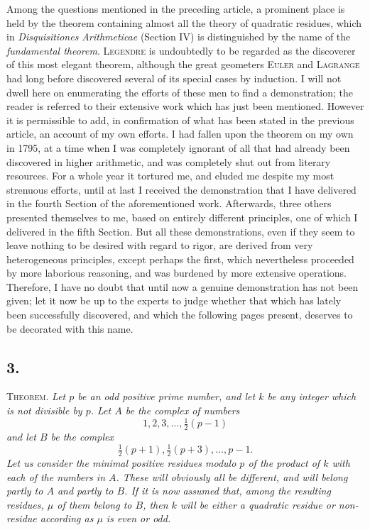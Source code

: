 \documentclass[14pt]{memoir}
\theoremstyle{plain}
\theoremstyle{remark}
\begin{document}
Among the questions mentioned in the preceding article, a prominent place is held by the theorem containing almost all the theory of quadratic residues, which in  \textit{Disquisitiones Arithmeticae} (Section IV) is distinguished by the name of the \textit{fundamental theorem}.  \textsc{Legendre} is undoubtedly to be regarded as the discoverer of this most elegant theorem, although the great geometers \textsc{Euler} and \textsc{Lagrange} had long before discovered several of its special cases by induction.   I will not dwell here on enumerating the efforts of these men to find a demonstration; the reader is referred to their extensive work which has just been mentioned.  However it is permissible to add, in confirmation of what has been stated in the previous article, an account of my own efforts.   I had fallen upon the theorem on my own in 1795, at a time when I was completely ignorant of all that had already been discovered in higher arithmetic, and was completely shut out from literary resources.  For a whole year it tortured me, and eluded me despite my most strenuous efforts, until at last I received the demonstration that I have delivered in the fourth Section of the aforementioned work.  Afterwards, three others presented themselves to me, based on entirely different principles, one of which I delivered in the fifth Section.  But all these demonstrations, even if they seem to leave nothing to be desired with regard to rigor, are derived from very heterogeneous principles, except perhaps the first, which nevertheless proceeded by more laborious reasoning, and was burdened by more extensive operations.  Therefore, I have no doubt that until now a genuine demonstration has not been given;  let it now be up to the experts to judge whether that which has lately been successfully discovered, and which the following pages present, deserves to be decorated with this name.

\subsection*{3.}

\textsc{Theorem}. \textit{ Let $p$ be an odd positive prime number, and let $k$ be any integer which is not divisible by $p$.  Let $A$ be the complex of numbers 
\[ 1, 2, 3, \dots, \tfrac{1}{2}(p-1) \]
and let $B$ be the complex 
\[ \tfrac{1}{2}(p+1), \tfrac{1}{2}(p+3),\dots, p-1. \]
Let us consider the minimal positive residues modulo $p$ of the product of $k$ with each of the numbers in $A$.  These will obviously all be different, and will belong partly to $A$ and partly to $B$.  If it is now assumed that, among the resulting residues, $\mu$ of them belong to $B$, then $k$ will be either a quadratic residue or non-residue according as $\mu$ is even or odd.}
\end{document}
